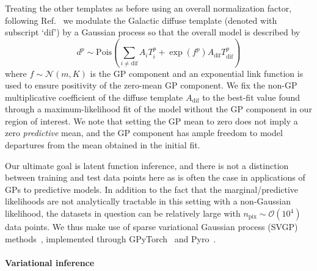 \documentclass[]{article}
\begin{document}
Treating the other templates as before using an overall normalization factor, following Ref.~\cite{Buschmann:2020adf} we modulate the Galactic diffuse template (denoted with subscript `dif') by a Gaussian process so that the overall model is described by
%
\begin{equation}
  d^{p} \sim \mathrm{Pois}\left(\sum_{i\neq\mathrm{dif}} A_i T_{i}^{p} + \exp\left(f^{p}\right)A_\mathrm{dif}T_\mathrm{dif}^{p}\right)
  \label{eq:poisson_gp}
\end{equation}
%
where $f\sim \mathcal{N}\left(m, K\right)$ is the GP component and an exponential link function is used to ensure positivity of the zero-mean GP component. We fix the non-GP multiplicative coefficient of the diffuse template $A_\mathrm{dif}$ to the best-fit value found through a maximum-likelihood fit of the model without the GP component in our region of interest. We note that setting the GP mean to zero does not imply a zero \emph{predictive} mean, and the GP component has ample freedom to model departures from the mean obtained in the initial fit.

Our ultimate goal is latent function inference, and there is not a distinction between training and test data points here as is often the case in applications of GPs to predictive models. In addition to the fact that the marginal/predictive likelihoods are not analytically tractable in this setting with a non-Gaussian likelihood, the datasets in question can be relatively large with $n_\mathrm{pix} \sim\mathcal{O}(10^4)$ data points. We thus make use of sparse variational Gaussian process (SVGP) methods~\cite{quinonero-candela_unifying_2005}, implemented through GPyTorch~\cite{gardner2018gpytorch,paszke2017automatic} and Pyro~\cite{bingham2019pyro}.

\paragraph{Variational inference}
\end{document}
